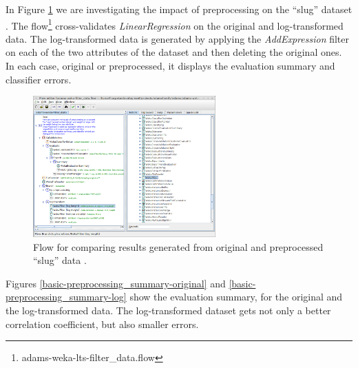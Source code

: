 In Figure \ref{basic-preprocessing_flow} we are investigating the impact of
preprocessing on the ``slug'' dataset \cite{slug}. The
flow\footnote{adams-weka-lts-filter\_data.flow} cross-validates
\textit{LinearRegression} on the original and log-transformed data. The
log-transformed data is generated by applying the \textit{AddExpression} filter
on each of the two attributes of the dataset and then deleting the original
ones. In each case, original or preprocessed, it displays the evaluation summary
and classifier errors.

\begin{figure}[htb]
  \centering
  \includegraphics[width=7.0cm]{images/basic-preprocessing_flow.png}
  \caption{Flow for comparing results generated from original and preprocessed
  ``slug'' data \cite{slug}.}
  \label{basic-preprocessing_flow}
\end{figure}

Figures \ref{basic-preprocessing_summary-original} and
\ref{basic-preprocessing_summary-log} show the evaluation summary, for the
original and the log-transformed data. The log-transformed dataset gets not
only a better correlation coefficient, but also smaller errors.

